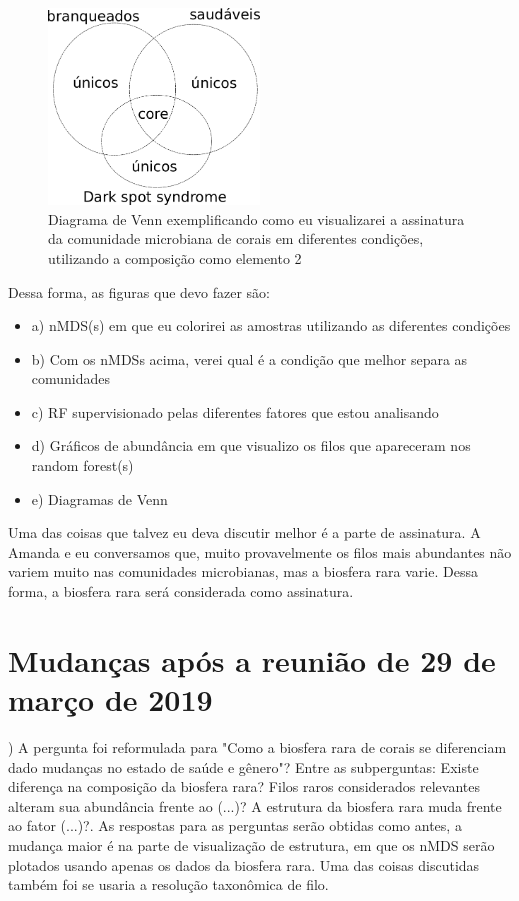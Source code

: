 \documentclass[12pt, a4paper]{report}
\begin{document}
\begin{figure}[H]
	\centering
	\includegraphics[width=0.5\textwidth]{figures/venn_diagram_health_condition_example.png}
	\caption{Diagrama de Venn exemplificando como eu visualizarei a assinatura da comunidade microbiana de corais em diferentes condições, utilizando a composição como elemento 2}
	\label{fig: Venndiagramhealthexample}
\end{figure}

Dessa forma, as figuras que devo fazer são:\\
\begin{itemize}
	\item a) nMDS(s) em que eu colorirei as amostras utilizando as diferentes condições
	\item b) Com os nMDSs acima, verei qual é a condição que melhor separa as comunidades
	\item c) RF supervisionado pelas diferentes fatores que estou analisando
	\item d) Gráficos de abundância em que visualizo os filos que apareceram nos random forest(s)
	\item e) Diagramas de Venn
\end{itemize}

Uma das coisas que talvez eu deva discutir melhor é a parte de assinatura. A Amanda e eu conversamos que, muito provavelmente os filos mais abundantes não variem muito nas comunidades microbianas, mas a biosfera rara varie. Dessa forma, a biosfera rara será considerada como assinatura.

\section{Mudanças após a reunião de 29 de março de 2019})
A pergunta foi reformulada para "Como a biosfera rara de corais se diferenciam dado mudanças no estado de saúde e gênero"? Entre as subperguntas: Existe diferença na composição da biosfera rara? Filos raros considerados relevantes alteram sua abundância frente ao (...)? A estrutura da biosfera rara muda frente ao fator (...)?. As respostas para as perguntas serão obtidas como antes, a mudança maior é na parte de visualização de estrutura, em que os nMDS serão plotados usando apenas os dados da biosfera rara. Uma das coisas discutidas também foi se usaria a resolução taxonômica de filo. 
\end{document}
